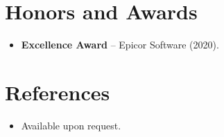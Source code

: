 \documentclass[11pt,a4paper,sans]{moderncv}
\begin{document}
\vspace{3pt}


\section{Honors and Awards}
\vspace{1pt}
\begin{itemize}
\item{\textbf{Excellence Award} -- Epicor Software (2020).}
\end{itemize}


\section{References}
\vspace{1pt}
\begin{itemize}
\item{Available upon request.}
\end{itemize}
\end{document}
